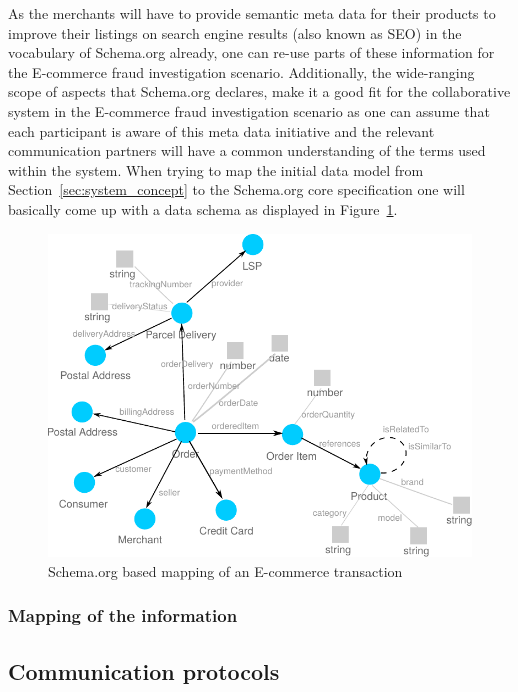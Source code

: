 As the merchants will have to provide semantic meta data for their products to improve their listings on search engine results (also known as \gls{SEO}) in the vocabulary of Schema.org already, one can re-use parts of these information for the \gls{E-commerce} fraud investigation scenario. Additionally, the wide-ranging scope of aspects that Schema.org declares, make it a good fit for the collaborative system in the \gls{E-commerce} fraud investigation scenario as one can assume that each participant is aware of this meta data initiative and the relevant communication partners will have a common understanding of the terms used within the system. When trying to map the initial data model from Section~\ref{sec:system_concept} to the Schema.org core specification one will basically come up with a data schema as displayed in Figure~\ref{fig:images_schema_org}. \@

\begin{figure}[!ht]
	\centering
		\includegraphics[width=0.8\columnwidth]{images/schema_org_mapping.pdf}
	\caption{Schema.org based mapping of an \gls{E-commerce} transaction}
\label{fig:images_schema_org}
\end{figure}

\subsubsection{Mapping of the information}
\label{subsub:rdf_mapping_information}



\subsection{Communication protocols}
\label{subsec:comm_protocol}

